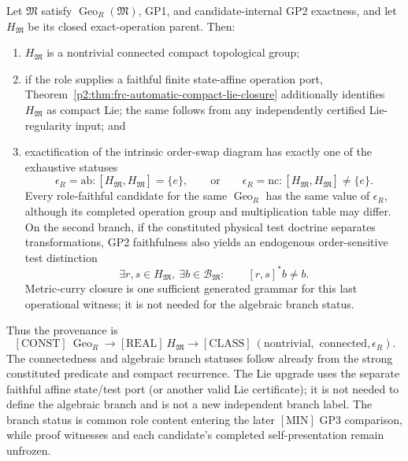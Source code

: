 \documentclass[12pt,a4paper]{article}
\begin{document}
\begin{theorem}
\label{p2:thm:geometric-existence-exactification}
Let \(\mathfrak M\) satisfy \(\operatorname{Geo}_R(\mathfrak M)\), GP1, and
candidate-internal GP2 exactness, and let \(H_{\mathfrak M}\) be its closed
exact-operation parent.  Then:
\begin{enumerate}[label=(\roman*),leftmargin=2em]
\item \(H_{\mathfrak M}\) is a nontrivial connected compact topological group;
\item if the role supplies a faithful finite state-affine operation port,
Theorem~\ref{p2:thm:frc-automatic-compact-lie-closure} additionally
identifies \(H_{\mathfrak M}\) as compact Lie; the same follows
from any independently certified Lie-regularity input; and
\item exactification of the intrinsic order-swap diagram has exactly one of
the exhaustive statuses
\[
 \epsilon_R=\mathrm{ab}:
 [H_{\mathfrak M},H_{\mathfrak M}]=\{e\},
 \qquad\text{or}\qquad
 \epsilon_R=\mathrm{nc}:
 [H_{\mathfrak M},H_{\mathfrak M}]\ne\{e\}.
\]
Every role-faithful candidate for the same
\(\operatorname{Geo}_R\) has the same value of \(\epsilon_R\), although its
completed operation group and multiplication table may differ.  On the second
branch, if the constituted physical test doctrine separates transformations,
GP2 faithfulness also yields an endogenous order-sensitive test distinction
\[
 \exists r,s\in H_{\mathfrak M},\ \exists b\in\mathcal B_{\mathfrak M}:
 \qquad [r,s]^*b\ne b.
\]
Metric-curry closure is one sufficient generated grammar for this last
operational witness; it is not needed for the algebraic branch status.
\end{enumerate}
Thus the provenance is
\[
 [\mathrm{CONST}]\ \operatorname{Geo}_R
 \longrightarrow[\mathrm{REAL}]\ H_{\mathfrak M}
 \longrightarrow[\mathrm{CLASS}]\
 (\text{nontrivial},\text{ connected},\epsilon_R).
\]
The connectedness and algebraic branch statuses follow already from
the strong constituted predicate and compact recurrence.  The Lie upgrade
uses the separate faithful affine state/test port (or another valid Lie
certificate); it is not needed to define the algebraic branch and is not
a new independent branch label.  The branch status is common role content entering the later
\([\mathrm{MIN}]\) GP3 comparison, while proof witnesses and each candidate's
completed self-presentation remain unfrozen.
\end{theorem}
\end{document}
